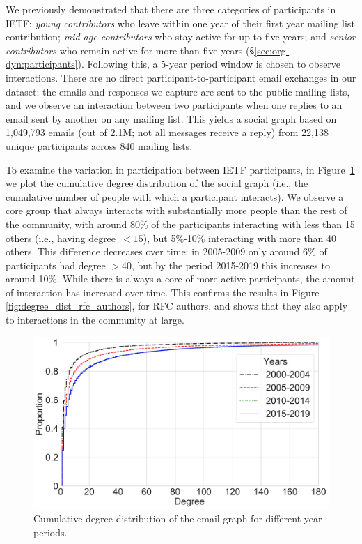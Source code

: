 \documentclass[twocolumn,10pt]{article}
\newlength{\figureWidthOneColumn}
\newcommand{\pb}[1]{\vspace{0.75ex}\noindent{\textbf{#1}}}
\begin{document}
We previously demonstrated that there are three categories of participants
in IETF: \textit{young contributors} who leave within one year of their
first year mailing list contribution; \textit{mid-age contributors} who
stay active for up-to five years; and \textit{senior contributors} who
remain active for more than five years (\S\ref{sec:org-dyn:participants}).
Following this, a 5-year period window is chosen to observe interactions.
There are no direct participant-to-participant email exchanges in our
dataset: the emails and responses we capture are sent to the public mailing
lists, and we observe an interaction between two participants when one
replies to an email sent by another on any mailing list. This yields a
social graph based on 1,049,793 emails (out of 2.1M; not all messages
receive a reply) from 22,138 unique participants across 840 mailing lists.

\pb{Participation}
To examine the variation in participation between IETF participants, in
Figure~\ref{fig:degree_cdf} we plot the cumulative degree distribution
of the social graph (i.e., the cumulative number of people with which a
participant interacts). We observe a core group that always interacts with
substantially more people than the rest of the community, with around 80\%
of the participants interacting with less than 15 others (i.e., having
degree~$<15$), but 5\%-10\% interacting with more than 40 others.
This difference decreases over time: in 2005-2009 only around 6\% of
participants had degree $>$40, but by the period 2015-2019 this increases
to around 10\%.
While there is always a core of more active participants, the amount of
interaction has increased over time.
This confirms the results in Figure \ref{fig:degree_dist_rfc_authors},
for RFC authors, and shows that they also apply to interactions in the
community at large.

\begin{figure}
  \centering
  \includegraphics[width=\figureWidthOneColumn]{figures-prev/icwsm-2022/degree_CDF.pdf}
  \caption{
    Cumulative degree distribution of the email graph for different
    year-periods.
  }
  \label{fig:degree_cdf}
\end{figure}
\end{document}
